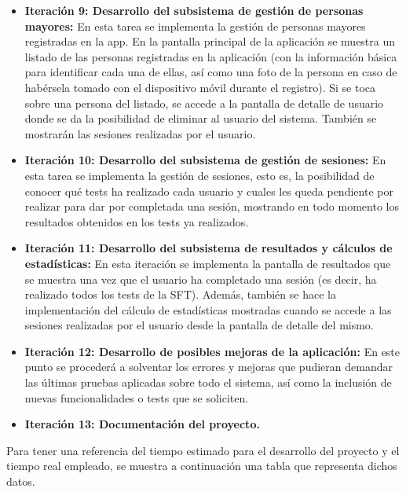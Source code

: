 \begin{itemize}
\item \textbf{Iteración 9: Desarrollo del subsistema de gestión de personas mayores:} En esta tarea se implementa la gestión de personas mayores registradas en la app. En la pantalla principal de la aplicación se muestra un listado de las personas registradas en la aplicación (con la información básica para identificar cada una de ellas, así como una foto de la persona en caso de habérsela tomado con el dispositivo móvil durante el registro). Si se toca sobre una persona del listado, se accede a la pantalla de detalle de usuario donde se da la posibilidad de eliminar al usuario del sistema. También se mostrarán las sesiones realizadas por el usuario.
\item \textbf{Iteración 10: Desarrollo del subsistema de gestión de sesiones:} En esta tarea se implementa la gestión de sesiones, esto es, la posibilidad de conocer qué tests ha realizado cada usuario y cuales les queda pendiente por realizar para dar por completada una sesión, mostrando en todo momento los resultados obtenidos en los tests ya realizados.
\item \textbf{Iteración 11: Desarrollo del subsistema de resultados y cálculos de estadísticas:} En esta iteración se implementa la pantalla de resultados que se muestra una vez que el usuario ha completado una sesión (es decir, ha realizado todos los tests de la SFT). Además, también se hace la implementación del cálculo de estadísticas mostradas cuando se accede a las sesiones realizadas por el usuario desde la pantalla de detalle del mismo.
\item \textbf{Iteración 12: Desarrollo de posibles mejoras de la aplicación:} En este punto se procederá a solventar los errores y mejoras que pudieran demandar las últimas pruebas aplicadas sobre todo el sistema, así como la inclusión de nuevas funcionalidades o tests que se soliciten.
\item \textbf{Iteración 13: Documentación del proyecto.}
\end{itemize}

Para tener una referencia del tiempo estimado para el desarrollo del proyecto y el tiempo real empleado, se muestra a continuación una tabla que representa dichos datos.\\

